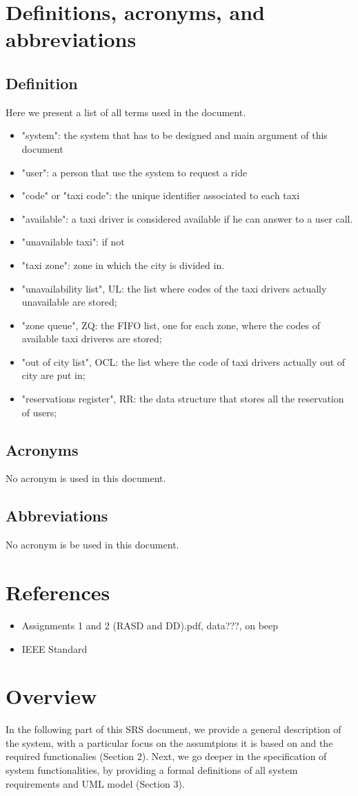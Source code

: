 \section{Definitions, acronyms, and abbreviations}
\subsection{Definition}
Here we present a list of all terms used in the document.
\begin{itemize}
\item "system": the system that has to be designed and main argument of this document
\item "user": a person that use the system to request a ride
\item "code" or "taxi code": the unique identifier associated to each taxi
\item "available": a taxi driver is considered available if he can answer to a user call.
\item "unavailable taxi": if not
\item "taxi zone": zone in which the city is divided in.
\item "unavailability list", UL: the list where codes of the taxi drivers actually unavailable are stored;
\item "zone queue", ZQ: the FIFO list, one for each zone, where the codes of available taxi driveres are stored;
\item "out of city list", OCL: the list where the code of taxi drivers actually out of city are put in;
\item "reservations register", RR: the data structure that stores all the reservation of users;
\end{itemize}

\subsection{Acronyms}
No acronym is used in this document.

\subsection{Abbreviations}
No acronym is be used in this document.

\section{References}
\begin{itemize}
\item Assignments 1 and 2 (RASD and DD).pdf, data???, on beep
\item IEEE Standard
\end{itemize}

\section{Overview}
In the following part of this SRS document, we provide a general description of the system, with a particular focus on the assumtpions it is based on and the required functionalies (Section 2). Next, we go deeper in the specification of system functionalities, by providing a formal definitions of all system requirements and UML model (Section 3).